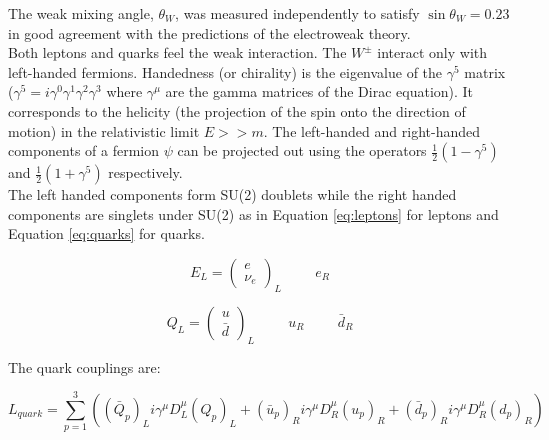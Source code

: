 The weak mixing angle, $\theta_{W}$, was measured independently \cite{sintheta} 
to satisfy $\sin\theta_{W} = 0.23$ in good agreement with the predictions of 
the electroweak theory. \\

Both leptons and quarks feel the weak interaction. The $W^{\pm}$ interact only
with left-handed fermions. Handedness (or chirality) is the eigenvalue of the 
$\gamma^{5}$ matrix ($\gamma^{5} = i\gamma^{0}\gamma^{1}\gamma^{2}\gamma^{3}$
where $\gamma^{\mu}$ are the gamma matrices of the Dirac equation). It 
corresponds to the helicity (the projection of the spin onto the direction of 
motion) in the relativistic limit $E >> m$. The left-handed and right-handed 
components of a fermion $\psi$ can be projected out using the operators 
$\frac{1}{2}(1 - \gamma^{5})$ and $\frac{1}{2}(1 + \gamma^{5})$ respectively. \\

The left handed components form SU(2) doublets while the right handed components
are singlets under SU(2) as in Equation \ref{eq:leptons} for leptons and
Equation \ref{eq:quarks} for quarks.

\begin{equation}
E_{L} = \left(\begin{array}{c}e\\\nu_{e}\end{array}\right)_{L} \hspace{1cm} e_{R}
\label{eq:leptons}
\end{equation}

\begin{equation}
Q_{L} = \left(\begin{array}{c}u\\\bar{d}\end{array}\right)_{L} \hspace{1cm}
u_{R} \hspace{1cm} \bar{d}_{R}
\label{eq:quarks}
\end{equation}

The quark couplings are:

\begin{equation}
L_{quark} = \displaystyle\sum\limits_{p=1}^3 \left( \left(\bar{Q}_{p}\right)_{L}
i\gamma^{\mu}D_{L}^{\mu} \left(Q_{p}\right)_{L} + \left(\bar{u}_{p}\right)_{R} 
i\gamma^{\mu}D_{R}^{\mu} \left(u_{p}\right)_{R} + \left(\bar{d}_{p}\right)_{R} 
i\gamma^{\mu}D_{R}^{\mu} \left(d_{p}\right)_{R} \right)
\label{eq:yukawa}
\end{equation}

